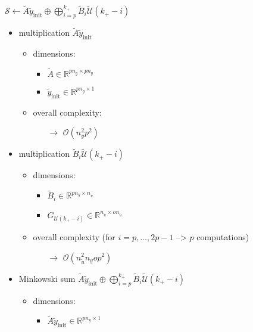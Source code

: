 \documentclass{article}
\begin{document}
${\mathcal{S}} \gets \tilde{A} \tilde{y}_\text{init} \oplus \bigoplus_{i=p}^{k_+} \tilde{B}_{i} \tilde{\mathcal{U}}(k_+-i)$
\begin{itemize}
    \item multiplication $\tilde{A} \tilde{y}_\text{init}$
    \begin{itemize}
        \item dimensions:
        \begin{itemize}
            \item $\tilde{A} \in \mathbb{R}^{pn_y \times pn_y}$
            \item $\tilde{y}_\text{init} \in \mathbb{R}^{pn_y \times 1}$
        \end{itemize}
        \item overall complexity: %
        \begin{itemize}
            \item[$\rightarrow$] $\mathcal{O}(n_y^2 p^2)$
        \end{itemize}
    \end{itemize}
    \item multiplication $\tilde{B}_{i} \tilde{\mathcal{U}}(k_+-i)$
    \begin{itemize}
        \item dimensions:
        \begin{itemize}
            \item $\tilde{B}_{i} \in \mathbb{R}^{pn_y \times n_{\tilde{u}}}$
            \item $G_{\mathcal{U}(k_+-i)} \in \mathbb{R}^{n_{\tilde{u}} \times o n_{\tilde{u}}}$
        \end{itemize}
        \item overall complexity (for $i=p,...,2p-1$ --> $p$ computations)
        \begin{itemize}
            \item[$\rightarrow$] $\mathcal{O}(n_{\tilde{u}}^2 n_y o p^2)$
        \end{itemize}
    \end{itemize}
    \item Minkowski sum $\tilde{A} \tilde{y}_\text{init} \oplus \bigoplus_{i=p}^{k_+} \tilde{B}_{i} \tilde{\mathcal{U}}(k_+-i)$
    \begin{itemize}
        \item dimensions:
        \begin{itemize}
            \item $\tilde{A} \tilde{y}_\text{init} \in \mathbb{R}^{pn_y \times 1}$ 

\end{itemize}
\end{itemize}
\end{itemize}
\end{document}
